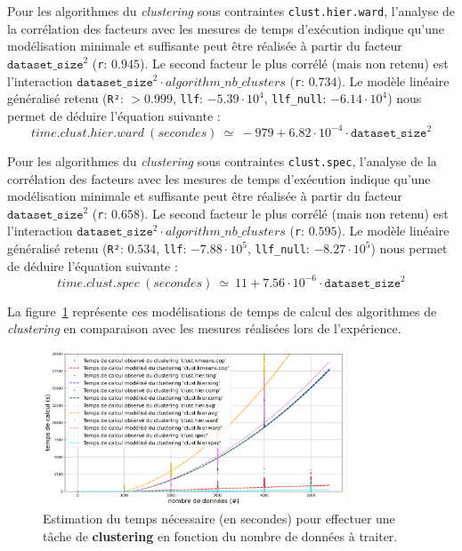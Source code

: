			Pour les algorithmes du \textit{clustering} sous contraintes \texttt{clust.hier.ward}, l'analyse de la corrélation des facteurs avec les mesures de temps d'exécution indique qu'une modélisation minimale et suffisante peut être réalisée à partir du facteur $\texttt{dataset\_size}^{2}$ (\texttt{r}: $0.945$).
			Le second facteur le plus corrélé (mais non retenu) est l'interaction $\texttt{dataset\_size}^{2} \cdot algorithm\_nb\_clusters$ (\texttt{r}: $0.734$).
			Le modèle linéaire généralisé retenu (\texttt{R²}: $> 0.999$, \texttt{llf}: $-5.39 \cdot 10^{4}$, \texttt{llf\_null}: $-6.14 \cdot 10^{4}$) nous permet de déduire l'équation suivante :
			\begin{equation}
				time.clust.hier.ward~(secondes)~
				\simeq~-979 + 6.82 \cdot 10^{-4} \cdot \texttt{dataset\_size}^{2}
			\end{equation}
			
			Pour les algorithmes du \textit{clustering} sous contraintes \texttt{clust.spec}, l'analyse de la corrélation des facteurs avec les mesures de temps d'exécution indique qu'une modélisation minimale et suffisante peut être réalisée à partir du facteur $\texttt{dataset\_size}^{2}$ (\texttt{r}: $0.658$).
			Le second facteur le plus corrélé (mais non retenu) est l'interaction $\texttt{dataset\_size}^{2} \cdot algorithm\_nb\_clusters$ (\texttt{r}: $0.595$).
			Le modèle linéaire généralisé retenu (\texttt{R²}: $0.534$, \texttt{llf}: $-7.88 \cdot 10^{5}$, \texttt{llf\_null}: $-8.27 \cdot 10^{5}$) nous permet de déduire l'équation suivante :
			\begin{equation}
				time.clust.spec~(secondes)~
				\simeq~11 + 7.56 \cdot 10^{-6} \cdot \texttt{dataset\_size}^{2}
			\end{equation}
			
			La figure~\ref{figure:4.3.2-ETUDE-COUTS-TEMPS-CALCUL-MODELISATION-CLUSTERING} représente ces modélisations de temps de calcul des algorithmes de \textit{clustering} en comparaison avec les mesures réalisées lors de l'expérience.
			\newline
			\begin{figure}[!htb]
				\centering
				\includegraphics[width=0.8\textwidth]{figures/etude-temps-calcul-modelisation-3clust}
				\caption{Estimation du temps nécessaire (en secondes) pour effectuer une tâche de \textbf{clustering} en fonction du nombre de données à traiter.}
				\label{figure:4.3.2-ETUDE-COUTS-TEMPS-CALCUL-MODELISATION-CLUSTERING}
			\end{figure}
			
